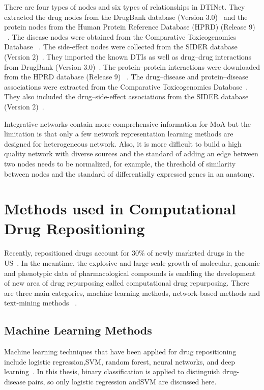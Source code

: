 There are four types of nodes and six types of relationships in DTINet. They extracted the drug nodes from the DrugBank database (Version 3.0)~\cite{knox_drugbank_2011} and the protein nodes from the Human Protein Reference Database (HPRD) (Release 9) ~\cite{keshava_prasad_human_2009}. The disease nodes were obtained from the Comparative Toxicogenomics Database ~\cite{davis_comparative_2013}. The side-effect nodes were collected from the SIDER database (Version 2)~\cite{kuhn_side_2010}. They imported the known DTIs as well as drug–drug interactions from DrugBank (Version 3.0)~\cite{knox_drugbank_2011}. The protein–protein interactions were downloaded from the HPRD database (Release 9) ~\cite{keshava_prasad_human_2009}. The drug–disease and protein–disease associations were extracted from the Comparative Toxicogenomics Database~\cite{davis_comparative_2013}. They also included the drug–side-effect associations from the SIDER database (Version 2)~\cite{kuhn_side_2010}.

Integrative networks contain more comprehensive information for \ac{MoA} but the limitation is that only a few network representation learning methods are designed for heterogeneous network. Also, it is more difficult to build a high quality network with diverse sources and the standard of adding an edge between two nodes needs to be normalized, for example, the threshold of similarity between nodes and the standard of differentially expressed genes in an anatomy.

\section{Methods used in Computational Drug Repositioning}

Recently, repositioned drugs account for 30\% of newly marketed drugs in the US~\cite{plenge_validating_2013}. In the meantime, the explosive and large-scale growth of molecular, genomic and phenotypic data of pharmacological compounds is enabling the development of new area of drug repurposing called computational drug repurposing. There are three main categories, machine learning methods, network-based methods and text-mining methods ~\cite{park_review_2019}.

\subsection{Machine Learning Methods}

Machine learning techniques that have been applied for drug repositioning include logistic regression,\ac{SVM}, random forest, neural networks, and deep learning~\cite{park_review_2019}. In this thesis, binary classification is applied to distinguish drug-disease pairs, so only logistic regression and\ac{SVM} are discussed here.

